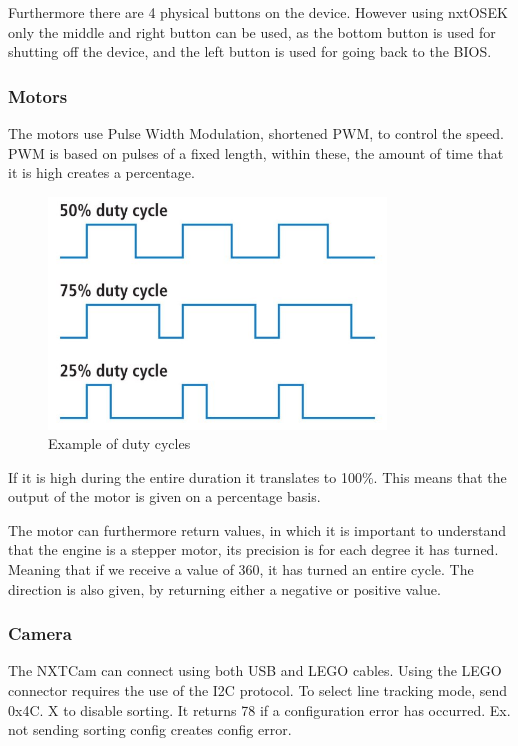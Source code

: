Furthermore there are 4 physical buttons on the device. However using nxtOSEK only the middle and right button can be used, as the bottom button is used for shutting off the device, and the left button is used for going back to the BIOS.

\subsubsection*{Motors}
The motors use Pulse Width Modulation, shortened PWM, to control the speed. PWM is based on pulses of a fixed length, within these, the amount of time that it is high creates a percentage.

\begin{figure}[H]
    \label{software_duty_cycles}
    \centering
    \includegraphics[width=0.8\textwidth]{Images/Software/NXT/duty_cycle.jpg}
    \caption{Example of duty cycles}
\end{figure}

If it is high during the entire duration it translates to 100\%. This means that the output of the motor is given on a percentage basis.

The motor can furthermore return values, in which it is important to understand that the engine is a stepper motor, its precision is for each degree it has turned. Meaning that if we receive a value of 360, it has turned an entire cycle. The direction is also given, by returning either a negative or positive value.

\subsubsection*{Camera}
The NXTCam can connect using both USB and LEGO cables. Using the LEGO connector requires the use of the I2C protocol.
To select line tracking mode, send 0x4C. X to disable sorting. It returns 78 if a configuration error has occurred. Ex. not sending sorting config creates config error.

